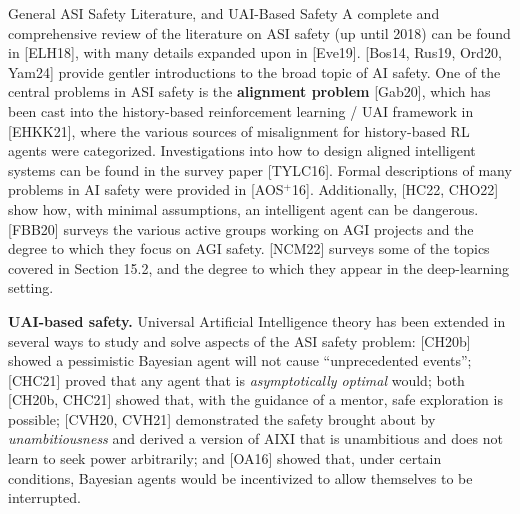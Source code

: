 \documentclass[aspectratio=169,10pt]{beamer}
\begin{document}
\begin{frame}[allowframebreaks]{General ASI Safety Literature, and UAI-Based Safety}
  A complete and comprehensive review of the literature on ASI safety (up
  until 2018) can be found in [ELH18], with many details expanded upon in
  [Eve19]. [Bos14, Rus19, Ord20, Yam24] provide gentler introductions to
  the broad topic of AI safety. One of the central problems in ASI safety
  is the \textbf{alignment problem} [Gab20], which has been cast into the
  history-based reinforcement learning / UAI framework in [EHKK21], where
  the various sources of misalignment for history-based RL agents were
  categorized. Investigations into how to design aligned intelligent
  systems can be found in the survey paper [TYLC16]. Formal descriptions
  of many problems in AI safety were provided in [AOS$^+$16].
  Additionally, [HC22, CHO22] show how, with minimal assumptions, an
  intelligent agent can be dangerous. [FBB20] surveys the various active
  groups working on AGI projects and the degree to which they focus on
  AGI safety. [NCM22] surveys some of the topics covered in Section 15.2,
  and the degree to which they appear in the deep-learning setting.

  \framebreak

  \textbf{UAI-based safety.} Universal Artificial Intelligence theory has
  been extended in several ways to study and solve aspects of the ASI
  safety problem: [CH20b] showed a pessimistic Bayesian agent will not
  cause ``unprecedented events''; [CHC21] proved that any agent that is
  \emph{asymptotically optimal} would; both [CH20b, CHC21] showed that,
  with the guidance of a mentor, safe exploration is possible; [CVH20,
  CVH21] demonstrated the safety brought about by \emph{unambitiousness}
  and derived a version of AIXI that is unambitious and does not learn to
  seek power arbitrarily; and [OA16] showed that, under certain
  conditions, Bayesian agents would be incentivized to allow themselves
  to be interrupted.
\end{frame}
\end{document}
